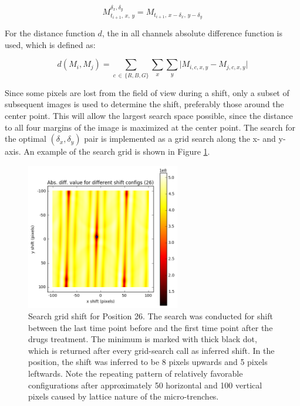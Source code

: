 \documentclass[pdftex,12pt,a4paper]{report}
\begin{document}
$$M_{t_{i+1}, \, x, \, y}^{\delta_x, \delta_y} = M_{t_{i+1}, \, x - \delta_x, \, y - \delta_y}$$

For the distance function $d$, the in all channels absolute difference function is used, which is defined as:

$$
d(M_i, M_j) = \sum_{c \, \in \, \{R, B, G\}} \sum_{x} \sum_{y} \vert M_{i, c, x, y} - M_{j, c, x, y} \vert
$$


Since some pixels are lost from the field of view during a shift, only a subset of subsequent images is used to determine the shift, preferably those around the center point. This will allow the largest search space possible, since the distance to all four margins of the image is maximized at the center point. The search for the optimal $(\delta_x, \delta_y)$ pair is implemented as a grid search along the x- and y-axis. An example of the search grid is shown in Figure \ref{fig:searchgrid}.\\

\begin{figure}[H]
\centering
\includegraphics[width=0.6\textwidth]{images/search_grid}
\caption{Search grid shift for Position 26. The search was conducted for shift between the last time point before and the first time point after the drugs treatment. The minimum is marked with thick black dot, which is returned after every grid-search call as inferred shift. In the position, the shift was inferred to be 8 pixels upwards and 5 pixels leftwards. Note the repeating pattern of relatively favorable configurations after approximately 50 horizontal and 100 vertical pixels caused by lattice nature of the micro-trenches.}
\label{fig:searchgrid}
\end{figure}

\end{document}
